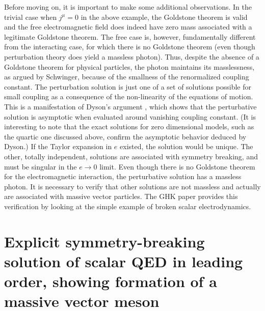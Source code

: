 \documentclass[12pt]{article}
\begin{document}
Before moving on, it is important to make some additional observations.  In
the trivial case when $j^{\mu} = 0$ in the above example, the Goldstone
theorem is valid and the free electromagnetic field does indeed have zero mass
associated with a legitimate Goldstone theorem.  The free case is, however,
fundamentally different from the interacting case, for which there is no
Goldstone theorem (even though perturbation theory does yield a massless
photon). Thus, despite the absence of a Goldstone theorem for physical
particles, the photon maintains its masslessness, as argued by Schwinger,
because of the smallness of the renormalized coupling constant. The
perturbation solution is just one of a set of solutions possible for small
coupling as a consequence of the non-linearity of the equations of
motion. This is a manifestation of Dyson's argument \cite{dyson;1952}, which
shows that the perturbative solution is asymptotic when evaluated around
vanishing coupling constant. (It is interesting to note that the exact
solutions for zero dimensional models, such as the quartic one discussed
above, confirm the asymptotic behavior deduced by Dyson.) If the Taylor
expansion in $e$ existed, the solution would be unique. The other, totally
independent, solutions are associated with symmetry breaking, and must be
singular in the $e\rightarrow 0$ limit. Even though there is no Goldstone theorem
for the electromagnetic interaction, the perturbative solution has a
massless photon. It is necessary to verify that other
solutions are not massless and actually are associated with massive vector particles.  The GHK
paper provides this verification by looking at the simple example of broken
scalar electrodynamics.

\section{Explicit symmetry-breaking solution of scalar QED in leading order,
  showing formation of a massive vector meson} \label{sec:6}
\end{document}
